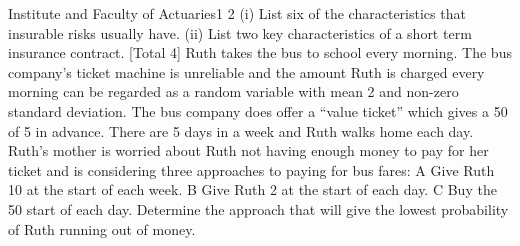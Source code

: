 \documentclass[a4paper,12pt]{article}
\begin{document}
\begin{enumerate}

Institute and Faculty of Actuaries1
2
(i) List six of the characteristics that insurable risks usually have. 
(ii) List two key characteristics of a short term insurance contract. 
[Total 4]
Ruth takes the bus to school every morning. The bus company’s ticket machine is
unreliable and the amount Ruth is charged every morning can be regarded as a
random variable with mean 2 and non-zero standard deviation. The bus company
does offer a “value ticket” which gives a 50%
of 5 in advance. There are 5 days in a week and Ruth walks home each day.
Ruth’s mother is worried about Ruth not having enough money to pay for her ticket
and is considering three approaches to paying for bus fares:
A Give Ruth 10 at the start of each week.
B Give Ruth 2 at the start of each day.
C Buy the 50%
start of each day.
Determine the approach that will give the lowest probability of Ruth running out of
money.






\end{enumerate}
\end{document}
